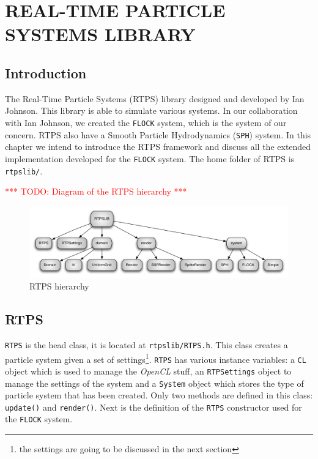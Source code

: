 \chapter{REAL-TIME PARTICLE SYSTEMS LIBRARY}\label{RTPSchapter}

\section{Introduction}
The Real-Time Particle Systems (RTPS) library designed and developed by Ian Johnson\cite{ianPaper}. This library is able to simulate various systems. In our collaboration with Ian Johnson, we created the \texttt{FLOCK} system, which is the system of our concern. RTPS also have a Smooth Particle Hydrodynamics (\texttt{SPH}) system. In this chapter we intend to introduce the RTPS framework and discuss all the extended implementation developed for the \texttt{FLOCK} system. The home folder of RTPS is \texttt{rtpslib/}.

\textcolor{red}{*** TODO: Diagram of the RTPS hierarchy ***}
\begin{figure}[htbp]
\begin{center}
\includegraphics[scale=0.5]{figures/RTPSdiagram.pdf}
\caption{RTPS hierarchy}
\label{RTPSdiagram}
\end{center}
\end{figure}



\section{RTPS}
\texttt{RTPS} is the head class, it is located at \texttt{rtpslib/RTPS.h}. This class creates a particle system given a set of settings\footnote{the settings are going to be discussed in the next section}. \texttt{RTPS} has various instance variables: a \texttt{CL} object which is used to manage the \textit{OpenCL} stuff,  an \texttt{RTPSettings} object to manage the settings of the system and a \texttt{System} object which stores the type of particle system that has been created. Only two methods are defined in this class: \texttt{update()} and \texttt{render()}. Next is the definition of the \texttt{RTPS} constructor used for the \texttt{FLOCK} system.


